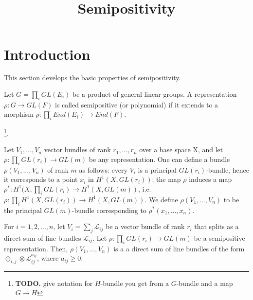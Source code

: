 


\newcommand{\todo}[1]{\footnote{\textbf{TODO.} #1}}


\title{Semipositivity}
\maketitle

\section{Introduction}
This section develops the basic properties of semipositivity.


\begin{definition}
Let $G=\prod_i GL(E_i)$ be a product of general linear groups. A representation $\rho:G\rightarrow GL(F)$ is called semipositive (or polynomial) if it extends to a morphism $\overline{\rho}:\prod_i End(E_i)\rightarrow End(F)$.
\end{definition}

\todo{give notation for $H$-bundle you get from a $G$-bundle and a map $G\to H$}.

\begin{definition}
Let $V_1,\dots, V_n$ vector bundles of rank $r_1,\dots, r_n$ over a base space X, and let $\rho:\prod_i GL(r_i)\rightarrow GL(m)$ be any representation. One can define a bundle $\rho(V_1,\dots, V_n)$ of rank $m$ as follows: every $V_i$ is a principal $GL(r_i)$-bundle, hence it corresponds to a point $x_i$ in $H^1(X, GL(r_i))$; the map $\rho$ induces a map $\rho^*:H^1(X,\prod_i GL(r_i)\rightarrow H^1(X, GL(m))$, i.e. $\rho: \prod_i H^1(X,GL(r_i))\rightarrow H^1(X, GL(m))$. We define $\rho(V_1,\dots, V_n)$ to be the principal $GL(m)$-bundle corresponding to $\rho^*(x_1,\dots,x_n)$.
\end{definition}

\begin{lemma}
For $i=1,2,\ldots,n$, let $V_i=\sum_{j}\mathcal{L}_{ij}$ be a vector bundle of rank $r_i$ that splits as a direct sum of line bundles $\mathcal{L}_{ij}$. Let $\rho:\prod_{i}GL(r_i)\to GL(m)$ be a semipositive representation. Then, $\rho(V_1,\ldots,V_n)$ is a a direct sum of line bundles of the form $\oplus_{i,j}\otimes\mathcal{L}_{ij}^{a_{ij}}$, where $a_{ij}\ge0$.
\end{lemma}


